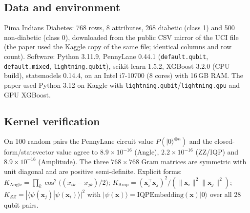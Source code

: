 \documentclass[11pt,a4paper]{article}
\newcommand{\code}[1]{\texttt{\small #1}}
\begin{document}
\subsection{Data and environment}
Pima Indians Diabetes: 768 rows, 8 attributes, 268 diabetic (class 1) and 500 non-diabetic (class 0), downloaded from the public CSV mirror of the UCI file (the paper used the Kaggle copy of the same file; identical columns and row count). Software: Python 3.11.9, PennyLane 0.44.1 (\code{default.qubit}, \code{default.mixed}, \code{lightning.qubit}), scikit-learn 1.5.2, XGBoost 3.2.0 (CPU build), statsmodels 0.14.4, on an Intel i7-10700 (8 cores) with 16\,GB RAM. The paper used Python 3.12 on Kaggle with \code{lightning.qubit}/\code{lightning.gpu} and GPU XGBoost.

\subsection{Kernel verification}
On 100 random pairs the PennyLane circuit value $P(|0\rangle^{\otimes n})$ and the closed-form/statevector value agree to $8.9\times10^{-16}$ (Angle), $2.2\times10^{-16}$ (ZZ/IQP) and $8.9\times10^{-16}$ (Amplitude). The three $768\times768$ Gram matrices are symmetric with unit diagonal and are positive semi-definite. Explicit forms: $K_{\mathrm{Angle}}=\prod_k\cos^2\!\big((x_{ik}-x_{jk})/2\big)$; $K_{\mathrm{Amp}}=(\mathbf{x}_i^{\top}\mathbf{x}_j)^2/(\|\mathbf{x}_i\|^2\|\mathbf{x}_j\|^2)$; $K_{ZZ}=|\langle\psi(\mathbf{x}_j)|\psi(\mathbf{x}_i)\rangle|^2$ with $|\psi(\mathbf{x})\rangle=\mathrm{IQPEmbedding}(\mathbf{x})|0\rangle$ over all 28 qubit pairs.
\end{document}
